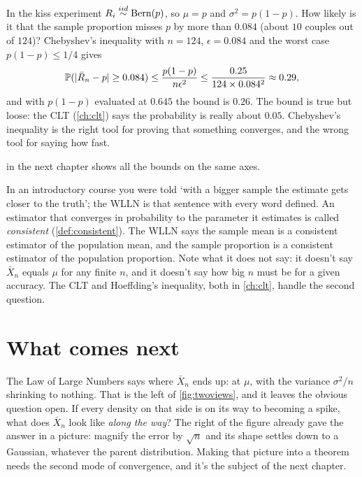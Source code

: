 \begin{worked}
In the kiss experiment $R_i \stackrel{iid}{\sim} \text{Bern}(p)$, so $\mu = p$ and $\sigma^2 = p(1-p)$.
How likely is it that the sample proportion misses $p$ by more than $0.084$ (about $10$ couples out of $124$)?
Chebyshev's inequality with $n = 124$, $\epsilon = 0.084$ and the worst case $p(1-p) \leq 1/4$ gives
\[
\mathbb{P}(\lvert\bar{R}_n - p\rvert \geq 0.084) \leq \frac{p(1-p)}{n \epsilon^2} \leq \frac{0.25}{124 \times 0.084^2} \approx 0.29,
\]
and with $p(1-p)$ evaluated at $0.645$ the bound is $0.26$.
The bound is true but loose: the CLT (\cref{ch:clt}) says the probability is really about $0.05$.
Chebyshev's inequality is the right tool for proving that something converges, and the wrong tool for saying how fast.
\end{worked}

 in the next chapter shows all the bounds on the same axes.

\begin{bridge}[consistency]
In an introductory course you were told `with a bigger sample the estimate gets closer to the truth'; the WLLN is that sentence with every word defined.
An estimator that converges in probability to the parameter it estimates is called \textit{consistent} (\cref{def:consistent}).
The WLLN says the sample mean is a consistent estimator of the population mean, and the sample proportion is a consistent estimator of the population proportion.
Note what it does not say: it doesn't say $\bar{X}_n$ equals $\mu$ for any finite $n$, and it doesn't say how big $n$ must be for a given accuracy.
The CLT and Hoeffding's inequality, both in \cref{ch:clt}, handle the second question.
\end{bridge}

\section{What comes next}
\label{sec:lln-next}

The Law of Large Numbers says where $\bar{X}_n$ ends up: at $\mu$, with the variance $\sigma^2/n$ shrinking to nothing.
That is the left of \cref{fig:twoviews}, and it leaves the obvious question open.
If every density on that side is on its way to becoming a spike, what does $\bar{X}_n$ look like \textit{along the way}?
The right of the figure already gave the answer in a picture: magnify the error by $\sqrt{n}$ and its shape settles down to a Gaussian, whatever the parent distribution.
Making that picture into a theorem needs the second mode of convergence, and it's the subject of the next chapter.

